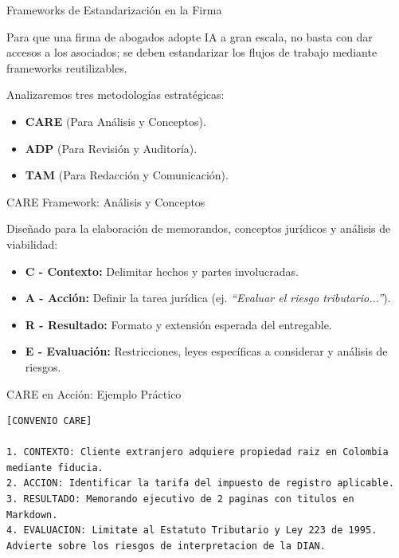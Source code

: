 \documentclass[aspectratio=169]{beamer}
\begin{document}
\begin{frame}[fragile]{Frameworks de Estandarización en la Firma}


Para que una firma de abogados adopte IA a gran escala, no basta con dar accesos a los asociados; se deben estandarizar los flujos de trabajo mediante frameworks reutilizables.

Analizaremos tres metodologías estratégicas:

\begin{itemize}
  \item \textbf{CARE} (Para Análisis y Conceptos).
  \item \textbf{ADP} (Para Revisión y Auditoría).
  \item \textbf{TAM} (Para Redacción y Comunicación).
\end{itemize}
\end{frame}



\begin{frame}[fragile]{CARE Framework: Análisis y Conceptos}


Diseñado para la elaboración de memorandos, conceptos jurídicos y análisis de viabilidad:

\begin{itemize}
  \item \textbf{C - Contexto:} Delimitar hechos y partes involucradas.
  \item \textbf{A - Acción:} Definir la tarea jurídica (ej. \textit{``Evaluar el riesgo tributario...''}).
  \item \textbf{R - Resultado:} Formato y extensión esperada del entregable.
  \item \textbf{E - Evaluación:} Restricciones, leyes específicas a considerar y análisis de riesgos.
\end{itemize}
\end{frame}



\begin{frame}[fragile]{CARE en Acción: Ejemplo Práctico}


\begin{lstlisting}[basicstyle=\ttfamily\scriptsize]
[CONVENIO CARE]

1. CONTEXTO: Cliente extranjero adquiere propiedad raiz en Colombia mediante fiducia.
2. ACCION: Identificar la tarifa del impuesto de registro aplicable.
3. RESULTADO: Memorando ejecutivo de 2 paginas con titulos en Markdown.
4. EVALUACION: Limitate al Estatuto Tributario y Ley 223 de 1995. Advierte sobre los riesgos de interpretacion de la DIAN.
\end{lstlisting}


\end{frame}
\end{document}
